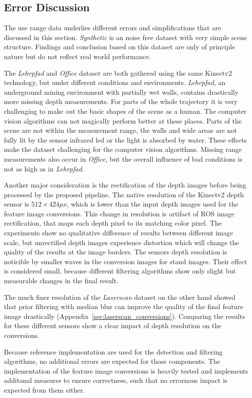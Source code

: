 \subsection{Error Discussion}

The use range data underlies different errors and simplifications that are discussed in this section.
\emph{Synthetic} is an noise free dataset with very simple scene structure.
Findings and conclusion based on this dataset are only of principle nature but do not reflect real world performance.

The \emph{Lehrpfad} and \emph{Office} dataset are both gathered using the same Kinectv2 technology, but under different conditions and environments.
\emph{Lehrpfad}, an underground mining environment with partially wet walls, contains drastically more missing depth measurements.
For parts of the whole trajectory it is very challenging to make out the basic shapes of the scene as a human.
The computer vision algorithms can not magically perform better at these places.
Parts of the scene are not within the measurement range, the walls and wide areas are not fully lit by the sensor infrared \acrshort{led} or the light is absorbed by water.
These effects make the dataset challenging for the computer vision algorithms.
Missing range measurements also occur in \emph{Office}, but the overall influence of bad conditions is not as high as in \emph{Lehrpfad}.

Another major consideration is the rectification of the depth images before being processed by the proposed pipeline.
The native resolution of the Kinectv2 depth sensor is $512 \times 424px$, which is lower than the input depth images used for the feature image conversions.
This change in resolution is artifact of \acrshort{ROS} image rectification, that maps each depth pixel to its matching color pixel.
The experiments show no qualitative difference of results between different image scale, but unrectified depth images experience distortion which will change the quality of the results at the image borders.
The sensors depth resolution is noticible by smaller waves in the conversion images for stand images.
Their effect is considered small, because different filtering algorithms show only slight but measurable changes in the final result.

The much finer resolution of the \emph{Laserscan} dataset on the other hand showed that prior filtering with median blur can improve the quality of the final feature image drastically (Appendix~\ref{sec:laserscan_conversions}).
Comparing the results for these different sensors show a clear impact of depth resolution on the conversions.

Because reference implementation are used for the detection and filtering algorithms, no additional errors are expected for those components.
The implementation of the feature image conversions is heavily tested and implements additonal measures to ensure correctness, such that no errornous impact is expected from them either.
